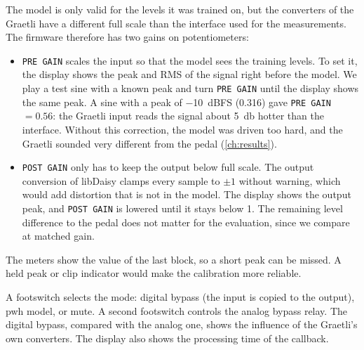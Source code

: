 The model is only valid for the levels it was trained on, but the converters of the Graetli have a different full scale than the interface used for the measurements. The firmware therefore has two gains on potentiometers:
\begin{itemize}
  \item \texttt{PRE GAIN} scales the input so that the model sees the training levels. To set it, the display shows the peak and RMS of the signal right before the model. We play a test sine with a known peak and turn \texttt{PRE GAIN} until the display shows the same peak. A sine with a peak of \SI{-10}{dBFS} (0.316) gave \texttt{PRE GAIN}~$= 0.56$: the Graetli input reads the signal about \SI{5}{\decibel} hotter than the interface. Without this correction, the model was driven too hard, and the Graetli sounded very different from the pedal (\cref{ch:results}).
  \item \texttt{POST GAIN} only has to keep the output below full scale. The output conversion of libDaisy clamps every sample to $\pm 1$ without warning, which would add distortion that is not in the model. The display shows the output peak, and \texttt{POST GAIN} is lowered until it stays below 1. The remaining level difference to the pedal does not matter for the evaluation, since we compare at matched gain.
\end{itemize}
The meters show the value of the last block, so a short peak can be missed. A held peak or clip indicator would make the calibration more reliable.

A footswitch selects the mode: digital bypass (the input is copied to the output), \gls{pwh} model, or mute. A second footswitch controls the analog bypass relay. The digital bypass, compared with the analog one, shows the influence of the Graetli's own converters. The display also shows the processing time of the callback.